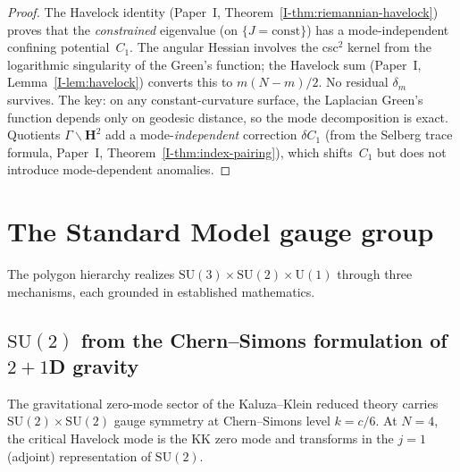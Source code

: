 \begin{proof}
The Havelock identity (Paper~I, Theorem~\ref{I-thm:riemannian-havelock})
proves that the \emph{constrained} eigenvalue (on $\{J = \mathrm{const}\}$)
has a mode-independent confining potential~$C_1$.
The angular Hessian involves the csc$^2$ kernel from the logarithmic
singularity of the Green's function; the Havelock sum
(Paper~I, Lemma~\ref{I-lem:havelock}) converts this to $m(N{-}m)/2$.
No residual $\delta_m$ survives.
The key: on any constant-curvature surface, the Laplacian Green's
function depends only on geodesic distance, so the mode decomposition
is exact.
Quotients $\Gamma\backslash\mathbf{H}^2$ add a mode-\emph{independent}
correction $\delta C_1$ (from the Selberg trace formula,
Paper~I, Theorem~\ref{I-thm:index-pairing}), which shifts~$C_1$
but does not introduce mode-dependent anomalies.
\end{proof}

\section{The Standard Model gauge group}
\label{sec:gauge-group}

The polygon hierarchy realizes
$\mathrm{SU}(3) \times \mathrm{SU}(2) \times \mathrm{U}(1)$
through three mechanisms, each grounded in established mathematics.

\subsection{$\mathrm{SU}(2)$ from the Chern--Simons formulation of
$2{+}1$D gravity}
\label{sec:chiral-su2}

\begin{derivation}
\label{thm:su2}
The gravitational zero-mode sector of the Kaluza--Klein reduced theory
carries $\mathrm{SU}(2) \times \mathrm{SU}(2)$ gauge symmetry at
Chern--Simons level $k = c/6$.
At $N = 4$, the critical Havelock mode is the KK zero mode
and transforms in the $j = 1$ (adjoint) representation of $\mathrm{SU}(2)$.
\end{derivation}

